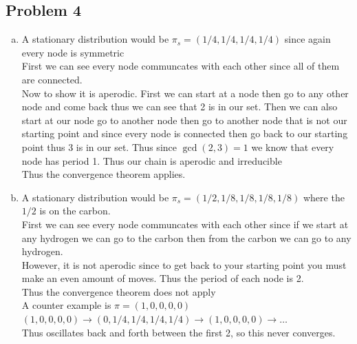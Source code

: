 \documentclass[12pt, letterpaper]{article}
\theoremstyle{definition}
\begin{document}
\newpage
\subsection*{Problem 4}
\begin{enumerate}[(a)]
    \item A stationary distribution would be $\pi_s = \left( 1/4,1/4,1/4,1/4 \right)$ since again every node is symmetric\\
    First we can see every node communcates with each other since all of them are connected.\\
    Now to show it is aperodic. First we can start at a node then go to any other node and come back thus we can see that 2 is in our set. Then we can also start at our node go to another node then go to another node that is not our starting point and since every node is connected then go back to our starting point thus 3 is in our set. Thus since $\gcd(2,3)=1$ we know that every node has period 1. Thus our chain is aperodic and irreducible\\
    Thus the convergence theorem applies.
    \item A stationary distribution would be $\pi_s = \left( 1/2,1/8,1/8,1/8,1/8 \right)$ where the $1/2$ is on the carbon.\\
    First we can see every node communcates with each other since if we start at any hydrogen we can go to the carbon then from the carbon we can go to any hydrogen.\\
    However, it is not aperodic since to get back to your starting point you must make an even amount of moves. Thus the period of each node is 2.\\
    Thus the convergence theorem does not apply\\
    A counter example is $\pi=\left( 1,0,0,0,0 \right)$\\
    $\left( 1,0,0,0,0 \right) \rightarrow \left( 0,1/4,1/4,1/4,1/4 \right) \rightarrow \left( 1,0,0,0,0 \right) \rightarrow \dots$\\
    Thus oscillates back and forth between the first 2, so this never converges.
\end{enumerate}
\end{document}
